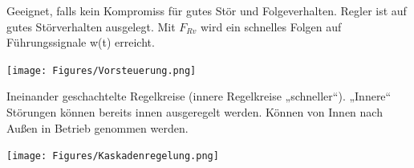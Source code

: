 \begin{mdframed}[style=exercise, frametitle=Vorsteuerung:]
	Geeignet, falls kein Kompromiss für gutes Stör und Folgeverhalten.
	Regler ist auf gutes Störverhalten ausgelegt. Mit $F_{Rv}$ wird ein schnelles Folgen
	auf Führungssignale w(t) erreicht.
\end{mdframed}

\texttt{[image: Figures/Vorsteuerung.png]}


\begin{mdframed}[style=exercise, frametitle=Kaskadenregelung:]
	Ineinander geschachtelte Regelkreise (innere Regelkreise „schneller“). „Innere“
	Störungen können bereits innen ausgeregelt werden. Können von Innen nach Außen in Betrieb genommen werden.
\end{mdframed}

\texttt{[image: Figures/Kaskadenregelung.png]}

\newpage